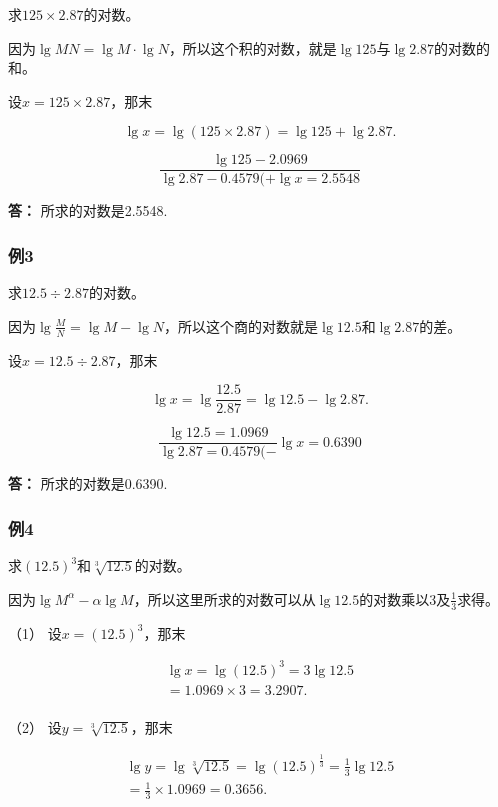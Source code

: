 求\(125 \times 2.87\)的对数。

因为\(\lg MN = \lg M \cdot \lg N\)，所以这个积的对数，就是\(\lg 125\)与\(\lg 2.87\)的对数的和。

 设\(x = 125 \times 2.87\)，那末

\[
\lg x = \lg (125 \times 2.87) = \lg 125 + \lg 2.87.
\]

\[
\frac{\lg 125 - 2.0969}{\lg 2.87 - 0.4579 (+ \lg x = 2.5548}
\]

\textbf{答：} 所求的对数是2.5548.

\subsubsection{例3}

求\(12.5 \div 2.87\)的对数。

因为\(\lg \frac{M}{N} = \lg M - \lg N\)，所以这个商的对数就是\(\lg 12.5\)和\(\lg 2.87\)的差。

 设\(x = 12.5 \div 2.87\)，那末

\[
\lg x = \lg \frac{12.5}{2.87} = \lg 12.5 - \lg 2.87.
\]

\[
\frac{\lg 12.5 = 1.0969}{\lg 2.87 = 0.4579 (-}{\lg x = 0.6390}
\]

\textbf{答：} 所求的对数是0.6390.

\subsubsection{例4}

求\((12.5)^{3}\)和\(\sqrt[3]{12.5}\)的对数。

因为\(\lg M^{\alpha} - \alpha \lg M\)，所以这里所求的对数可以从\(\lg 12.5\)的对数乘以3及\(\frac{1}{3}\)求得。

 （1） 设\(x = (12.5)^3\)，那末

\[
\begin{array}{l} \lg x = \lg (12.5)^{3} = 3 \lg 12.5 \\ = 1.0969 \times 3 = 3.2907. \\ \end{array}
\]

（2） 设\(y = \sqrt[3]{12.5}\)，那末

\[
\begin{array}{l} \lg y = \lg \sqrt[3]{12.5} = \lg (12.5)^{\frac{1}{3}} = \frac{1}{3} \lg 12.5 \\ = \frac{1}{3} \times 1.0969 = 0.3656. \\ \end{array}
\]

